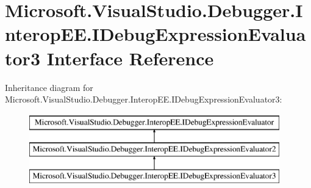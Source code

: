 \hypertarget{interface_microsoft_1_1_visual_studio_1_1_debugger_1_1_interop_e_e_1_1_i_debug_expression_evaluator3}{\section{Microsoft.\+Visual\+Studio.\+Debugger.\+Interop\+E\+E.\+I\+Debug\+Expression\+Evaluator3 Interface Reference}
\label{interface_microsoft_1_1_visual_studio_1_1_debugger_1_1_interop_e_e_1_1_i_debug_expression_evaluator3}
}
Inheritance diagram for Microsoft.\+Visual\+Studio.\+Debugger.\+Interop\+E\+E.\+I\+Debug\+Expression\+Evaluator3\+:\begin{figure}[H]
\begin{center}
\leavevmode
\includegraphics[height=3.000000cm]{interface_microsoft_1_1_visual_studio_1_1_debugger_1_1_interop_e_e_1_1_i_debug_expression_evaluator3}
\end{center}
\end{figure}
